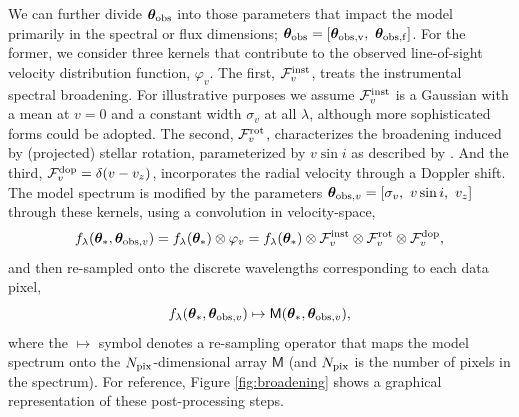 \documentclass[iop,floatfix]{emulateapj}
\newcommand{\vt}{ {\bm \theta}}
\newcommand{\vM}{\mathsf{M}}
\begin{document}
We can further divide $\vt_{\rm obs}$ into those parameters that impact the model primarily in the 
spectral or flux dimensions; $\vt_{\rm obs} = [\vt_{\rm obs, v}, \,\, \vt_{\rm obs, f}]$.  For the 
former, we consider three kernels that contribute to the observed line-of-sight velocity 
distribution function, $\varphi_v$.  The first, $\mathcal{F}_v^{\rm inst}$, treats the instrumental 
spectral broadening.  For illustrative purposes we assume $\mathcal{F}_v^{\rm inst}$ is a Gaussian 
with a mean at $v = 0$ and a constant width $\sigma_v$ at all $\lambda$, although more 
sophisticated forms could be adopted.  The second, $\mathcal{F}_v^{\rm rot}$, characterizes the 
broadening induced by (projected) stellar rotation, parameterized by $v\sin{i}$ as described by 
\citet[][his Eq.~18.14]{gray08}.  And the third, $\mathcal{F}_v^{\rm dop} = \delta(v-v_z)$, 
incorporates the radial velocity through a Doppler shift.  The model spectrum is modified by the 
parameters $\vt_{{\rm obs}, v} = [\sigma_v, \,\, v\sin{i}, \,\, v_z]$ through these kernels, using 
a convolution in velocity-space,
\begin{equation}
f_{\lambda}(\vt_{\ast}, \vt_{{\rm obs}, v}) = f_{\lambda}(\vt_{\ast}) \otimes \varphi_v = f_{\lambda}(\vt_{\ast}) \otimes \mathcal{F}_v^{\rm inst} \otimes \mathcal{F}_v^{\rm rot} \otimes \mathcal{F}_v^{\rm dop},
\label{eqn:broadening}
\end{equation}
and then re-sampled onto the discrete wavelengths corresponding to each data pixel, 
\begin{equation}
f_{\lambda}(\vt_{\ast}, \vt_{{\rm obs}, v}) \mapsto \vM(\vt_{\ast}, \vt_{{\rm obs}, v}),
\label{eqn:resampling}
\end{equation}
where the $\mapsto$ symbol denotes a re-sampling operator that maps the model spectrum onto the 
$N_{\rm pix}$-dimensional array $\vM$ (and $N_{\rm pix}$ is the number of pixels in the spectrum).  
For reference, Figure \ref{fig:broadening} shows a graphical representation of these 
post-processing steps.
\end{document}
